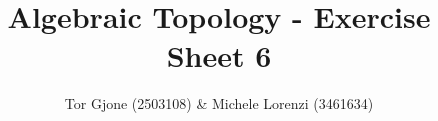 \documentclass[a4paper,11pt,english]{article}
\title{\textbf{Algebraic Topology} - Exercise Sheet 6}
\author{Tor Gjone (2503108) \& Michele Lorenzi (3461634)}
\begin{document}
\mmaketitle

\begin{exercise}[1]

\end{exercise}
\end{document}
